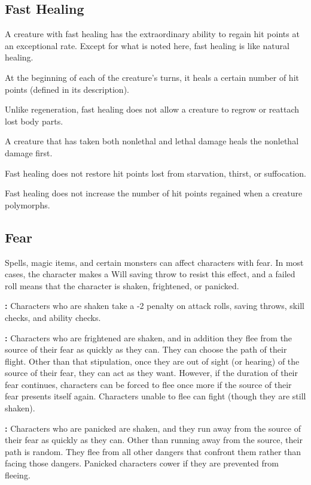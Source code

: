 \subsection{Fast Healing}

A creature with fast healing has the extraordinary ability to regain hit points 
at an exceptional rate. Except for what is noted here, fast healing is like natural 
healing. 

At the beginning of each of the creature's turns, it heals a certain number of 
hit points (defined in its description).

Unlike regeneration, fast healing does not allow a creature to regrow or reattach 
lost body parts.

A creature that has taken both nonlethal and lethal damage heals the nonlethal 
damage first.

Fast healing does not restore hit points lost from starvation, thirst, or suffocation.

Fast healing does not increase the number of hit points regained when a creature 
polymorphs.

\subsection{Fear}

Spells, magic items, and certain monsters can affect characters with fear. In most 
cases, the character makes a Will saving throw to resist this effect, and a failed 
roll means that the character is shaken, frightened, or panicked.

\textbf{:} Characters who are shaken take a -2 penalty on attack rolls, saving 
throws, skill checks, and ability checks.

\textbf{:} Characters who are frightened are shaken, and in addition 
they flee from the source of their fear as quickly as they can. They can choose 
the path of their flight. Other than that stipulation, once they are out of sight 
(or hearing) of the source of their fear, they can act as they want. However, if 
the duration of their fear continues, characters can be forced to flee once more 
if the source of their fear presents itself again. Characters unable to flee can 
fight (though they are still shaken).

\textbf{:} Characters who are panicked are shaken, and they run away from 
the source of their fear as quickly as they can. Other than running away from the 
source, their path is random. They flee from all other dangers that confront them 
rather than facing those dangers. Panicked characters cower if they are prevented 
from fleeing.

